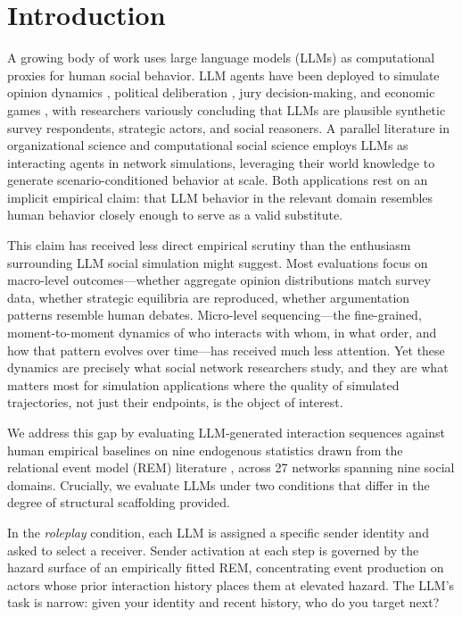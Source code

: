 \documentclass[11pt]{article}
\begin{document}
\newpage

\section{Introduction}

A growing body of work uses large language models (LLMs) as computational
proxies for human social behavior. LLM agents have been deployed to simulate
opinion dynamics \citep{argyle2023out}, political deliberation
\citep{manning2024automated}, jury decision-making, and economic games
\citep{horton2023large,aher2023using}, with researchers variously concluding that
LLMs are plausible synthetic survey respondents, strategic actors, and social
reasoners. A parallel literature in organizational science and computational
social science employs LLMs as interacting agents in network simulations,
leveraging their world knowledge to generate scenario-conditioned behavior at
scale. Both applications rest on an implicit empirical claim: that LLM behavior
in the relevant domain resembles human behavior closely enough to serve as a
valid substitute.

This claim has received less direct empirical scrutiny than the enthusiasm
surrounding LLM social simulation might suggest. Most evaluations focus on
macro-level outcomes---whether aggregate opinion distributions match survey
data, whether strategic equilibria are reproduced, whether argumentation
patterns resemble human debates. Micro-level sequencing---the fine-grained,
moment-to-moment dynamics of who interacts with whom, in what order, and
how that pattern evolves over time---has received much less attention. Yet
these dynamics are precisely what social network researchers study, and they
are what matters most for simulation applications where the quality of
simulated trajectories, not just their endpoints, is the object of interest.

We address this gap by evaluating LLM-generated interaction sequences against
human empirical baselines on nine endogenous statistics drawn from the
relational event model (REM) literature \citep{butts_sm_2008,gibson2025four},
across 27 networks spanning nine social domains. Crucially, we evaluate LLMs
under two conditions that differ in the degree of structural scaffolding
provided.

In the \emph{roleplay} condition, each LLM is assigned a specific sender
identity and asked to select a receiver. Sender activation at each step is
governed by the hazard surface of an empirically fitted REM, concentrating
event production on actors whose prior interaction history places them at
elevated hazard. The LLM's task is narrow: given your identity and recent
history, who do you target next?
\end{document}
